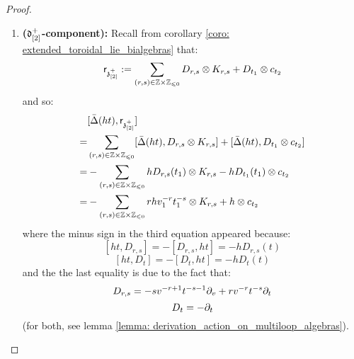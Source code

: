 \begin{proof}
\begin{enumerate}
\begin{enumerate}
                        \item \textbf{($\mathfrak{d}_{[2]}^{+}$-component):} Recall from corollary \ref{coro: extended_toroidal_lie_bialgebras} that:
                            $$\sfr_{\z_{[2]}^{\positive}} := \sum_{(r, s) \in \Z \x \Z_{\leq 0}} D_{r, s} \tensor K_{r, s} + D_{t_1} \tensor c_{t_2}$$
                        and so:
                            $$
                                \begin{aligned}
                                    & [\bar{\Delta}(ht), \sfr_{\z_{[2]}^{\positive}}]
                                    \\
                                    = & \sum_{(r, s) \in \Z \x \Z_{\leq 0}} [\bar{\Delta}(ht), D_{r, s} \tensor K_{r, s}] + [\bar{\Delta}(ht), D_{t_1} \tensor c_{t_2}]
                                    \\
                                    = & -\sum_{(r, s) \in \Z \x \Z_{\leq 0}} h D_{r, s}(t_1) \tensor K_{r, s} - h D_{t_1}(t_1) \tensor c_{t_2}
                                    \\
                                    = & -\sum_{(r, s) \in \Z \x \Z_{\leq 0}} r h v_1^{-r} t_1^{-s} \tensor K_{r, s} + h \tensor c_{t_2}
                                \end{aligned}
                            $$
                        where the minus sign in the third equation appeared because:
                            $$[ht, D_{r, s}] = -[D_{r, s}, ht] = -h D_{r, s}(t)$$
                            $$[ht, D_t] = -[D_t, ht] = -h D_t(t)$$
                        and the the last equality is due to the fact that:
                            $$D_{r, s} = -s v^{-r + 1} t^{-s - 1} \partial_v + r v^{-r} t^{-s} \partial_t$$
                            $$D_t = -\partial_t$$
                        (for both, see lemma \ref{lemma: derivation_action_on_multiloop_algebras}).
                    \end{enumerate}


\end{enumerate}
\end{proof}
